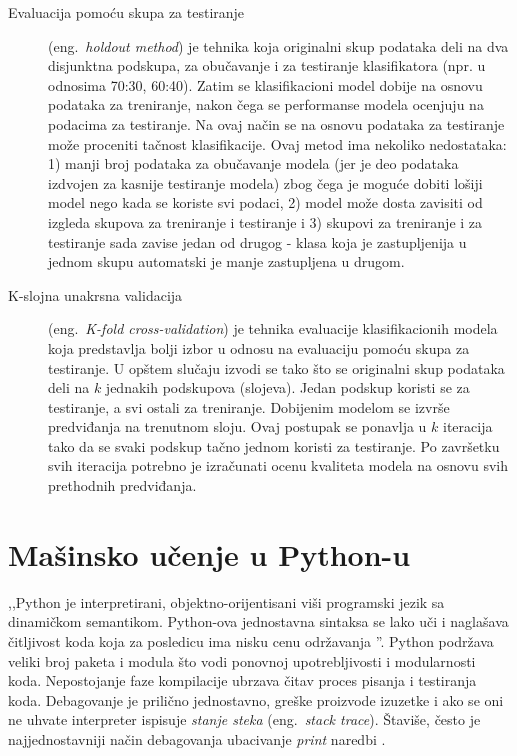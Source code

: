 \documentclass[12pt,oneside]{memoir}
\begin{document}
\begin{description}

\item[Evaluacija pomoću skupa za testiranje] (eng.~\textit{holdout method}) je tehnika koja originalni skup podataka deli na dva disjunktna podskupa, za obučavanje i za testiranje klasifikatora (npr. u odnosima 70:30, 60:40). Zatim se klasifikacioni model dobije na osnovu podataka za treniranje, nakon čega se performanse modela ocenjuju na podacima za testiranje. Na ovaj način se na osnovu podataka za testiranje može proceniti tačnost klasifikacije. Ovaj metod ima nekoliko nedostataka: 1) manji broj podataka za obučavanje modela (jer je deo podataka izdvojen za kasnije testiranje modela) zbog čega je moguće dobiti lošiji model nego kada se koriste svi podaci, 2) model može dosta zavisiti od izgleda skupova za treniranje i testiranje i 3) skupovi za treniranje i za testiranje sada zavise jedan od drugog - klasa koja je zastupljenija u jednom skupu automatski je manje zastupljena u drugom.

\item[K-slojna unakrsna validacija] (eng.~\textit{K-fold cross-validation}) je tehnika evaluacije klasifikacionih modela koja predstavlja bolji izbor u odnosu na evaluaciju pomoću skupa za testiranje. U opštem slučaju izvodi se tako što se originalni skup podataka deli na $k$ jednakih podskupova (slojeva). Jedan podskup koristi se za testiranje, a svi ostali za treniranje. Dobijenim modelom se izvrše predviđanja na trenutnom sloju. Ovaj postupak se ponavlja u $k$ iteracija tako da se svaki podskup tačno jednom koristi za testiranje. Po završetku svih iteracija potrebno je izračunati ocenu kvaliteta modela na osnovu svih prethodnih predviđanja. 
\end{description}


\section{Mašinsko učenje u Python-u}
,,Python je interpretirani, objektno-orijentisani viši programski jezik sa dinamičkom semantikom. Python-ova jednostavna sintaksa se lako uči i naglašava čitljivost koda koja za posledicu ima nisku cenu održavanja \cite{python-blurb}''. Python podržava veliki broj paketa i modula što vodi ponovnoj upotrebljivosti i modularnosti koda. Nepostojanje faze kompilacije ubrzava čitav proces pisanja i testiranja koda. Debagovanje je prilično jednostavno, greške proizvode izuzetke i ako se oni ne uhvate interpreter ispisuje \textit{stanje steka} (eng.~\textit{stack trace}). Štaviše, često je najjednostavniji način debagovanja ubacivanje \textit{print} naredbi \cite{python-blurb}. %
\end{document}
